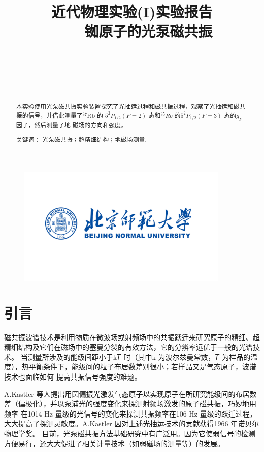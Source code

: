 \documentclass[10pt,hyperref,a4paper,UTF8]{ctexart}
\title{\vspace{-12pt}
        \songti \Huge \textbf{{近代物理实验(I)实验报告}} \\
        \vspace{12pt}
        \songti \huge \textbf{{——铷原子的光泵磁共振}}
        \vspace{12pt}
        }%
\author{
        \vspace{12pt}
        \kaishu\LARGE
        \makebox[5em][s]{学号}\ \ful[7cm]{202111030007} \\  %
        \vspace{12pt}
        \kaishu\LARGE
        \makebox[5em][s]{姓名}\ \ful[7cm]{郑晓旸} \\  %
        \vspace{12pt}
	\kaishu\LARGE
        \makebox[5em][s]{指导老师}\ \ful[7cm]{何琛娟} \\ %
        \kaishu\LARGE
        \makebox[5em][s]{实验时间}\ \ful[7cm]{11月 08日$13:30-21:30$} 
        }
\date{}
\begin{document}
\begin{figure}
	\centering
	\includegraphics[width=0.9\textwidth]{figures/bnu.pdf}
\end{figure} 

\maketitle
\thispagestyle{empty}
\newpage
\setcounter{page}{1}
\begin{abstract}
        本实验使用光泵磁共振实验装置探究了光抽运过程和磁共振过程，观察了光抽运和磁共振的信号，并借此测量了$^{87}\mathrm{Rb}$ 的 $5^2 P_{1/2}(F=2)$ 态和$^85Rb$ 的$5^2 P_{1/2}(𝐹 = 3)$ 态的$g_F$因子，然后测量了地
磁场的方向和强度。

        \heiti 关键词： \songti 光泵磁共振；超精细结构；地磁场测量.
\end{abstract}
\section{引言}
        磁共振波谱技术是利用物质在微波场或射频场中的共振跃迁来研究原子的精细、超精细结构及它们在磁场中的塞曼分裂的有效方法，它的分辨率远优于一般的光谱技术。
        当测量所涉及的能级间距小于k𝑇 时（其中k 为波尔兹曼常数，𝑇 为样品的温度），热平衡条件下，能级间的粒子布居数差别很小；若样品又是气态原子，波谱技术也面临如何
        提高共振信号强度的难题。

        A.Kastler 等人\cite{Kastler:57}提出用圆偏振光激发气态原子以实现原子在所研究能级间的布居数差（偏极化），并以泵浦光的强度变化来探测射频场激发的原子磁共振，巧妙地用频率
        在1014 Hz 量级的光信号的变化来探测共振频率在106 Hz 量级的跃迁过程，大大提高了探测灵敏度。A.Kastler 因对上述光抽运技术的贡献获得1966 年诺贝尔物理学奖。
        目前，光泵磁共振方法基础研究中有广泛用。因为它使弱信号的检测方便易行，还大大促进了相关计量技术（如弱磁场的测量等）的发展。
\end{document}
